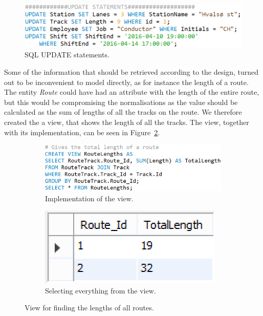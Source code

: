 \begin{figure}[h]
    \centering
    \includegraphics[scale=.5]{img/UPDATE_Statements}
    \caption{SQL UPDATE statements.}
    \label{fig:update}
\end{figure}

Some of the information that should be retrieved according to the design, 
turned out to be inconvenient to model directly, as for instance the length 
of a route. The entity \emph{Route} could have had an attribute with the length 
of the entire route, but this would be compromising the normalisations as the 
value should be calculated as the sum of lengths of all the tracks on the 
route. We therefore created the a view, that shows the length of all the 
tracks. The view, together with its implementation, can be seen in 
Figure~\ref{fig:length}.

\begin{figure}[h]
    \centering
    \begin{subfigure}[b]{0.45 \textwidth}
        \centering
        \includegraphics[width=\textwidth]{img/RouteLengths}
        \caption{Implementation of the view.}
    \end{subfigure}
    \begin{subfigure}[b]{0.45 \textwidth}
        \centering
        \includegraphics{img/RouteLengthsView}
        \caption{Selecting everything from the view.}
    \end{subfigure}
    \caption{View for finding the lengths of all routes.}
    \label{fig:length}
\end{figure}

